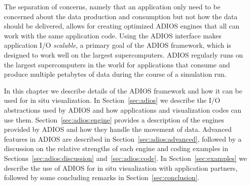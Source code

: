 \documentclass[x11names,table,xcdraw,graybox]{svmult}
\begin{document}

The separation of concerns, namely that an application only need to be concerned about the data production and consumption but not how the data should be delivered, allows for creating optimized ADIOS engines that all can work with the same application code.
Using the ADIOS interface makes application I/O \emph{scalable}, a primary goal of the ADIOS framework, which is designed to work well on the largest supercomputers. ADIOS regularly runs on the largest supercomputers in the world for applications that consume and produce multiple petabytes of data during the course of a simulation run.


In this chapter we describe details of the ADIOS framework and how it can be used for in situ visualization. In Section~\ref{sec:adios} we describe the I/O abstractions used by ADIOS and how applications and visualization codes can use them. Section~\ref{sec:adios:engine} provides a description of the engines provided by ADIOS and how they handle the movement of data. Advanced features in ADIOS are described in Section~\ref{sec:adios:advanced}, followed by a  discussion on the relative strengths of each engine and coding examples in Sections~\ref{sec:adios:discussion} and~\ref{sec:adios:code}. In Section~\ref{sec:examples} we describe the use of ADIOS for in situ visualization with application partners, followed by some concluding remarks in Section~\ref{sec:conclusion}.
\end{document}
